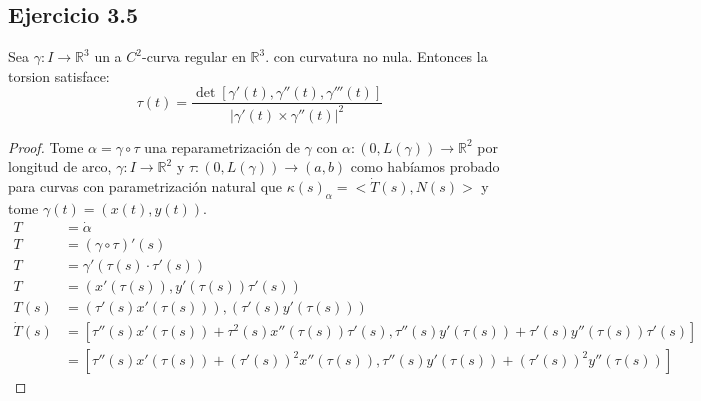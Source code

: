 \documentclass[12pt]{article}
\begin{document}
\subsection*{Ejercicio 3.5}
Sea $\gamma : I \rightarrow \mathbb{R}^3$ un a $C^2$-curva regular en $\mathbb{R}^3$. con curvatura no nula. Entonces la torsion satisface:
\begin{equation*}
\tau (t)=\frac{\det [\gamma '(t), \gamma ''(t), \gamma ''' (t)]}{|\gamma'(t) \times \gamma '' (t)|^2 }
\end{equation*}
\begin{proof}
Tome $\alpha= \gamma \circ \tau$ una reparametrizaci\'on de $\gamma$ con $\alpha: (0,L(\gamma)) \rightarrow \mathbb{R}^2$ por longitud de arco, $\gamma:I \rightarrow \mathbb{R}^2$ y $\tau: (0,L(\gamma)) \rightarrow (a,b)$ como hab\'iamos probado para curvas con parametrizaci\'on natural que $\kappa(s)_{\alpha}=<\dot{T}(s),N(s)>$ y tome $\gamma(t)=(x(t),y(t))$.
\begin{equation*}
\begin{split}
T&=\dot{\alpha}\\
T&=(\gamma \circ \tau)'(s)\\
T&=\gamma'(\tau(s) \cdot \tau'(s))\\
T&=(x'(\tau(s)), y'(\tau(s))\tau'(s))\\
T(s)&=(\tau'(s)x'(\tau(s))), (\tau'(s)y'(\tau(s)))\\
\dot{T}(s)&=[\tau''(s)x'(\tau(s)) + \tau^2(s)x''(\tau(s))\tau'(s), \tau''(s)y'(\tau(s))+\tau'(s)y''(\tau(s))\tau'(s)] \\
&=[\tau''(s)x'(\tau(s))+(\tau'(s))^2x''(\tau(s)), \tau''(s)y'(\tau(s))+(\tau'(s))^2y''(\tau(s))]
\end{split}
\end{equation*}


\end{proof}
\end{document}
